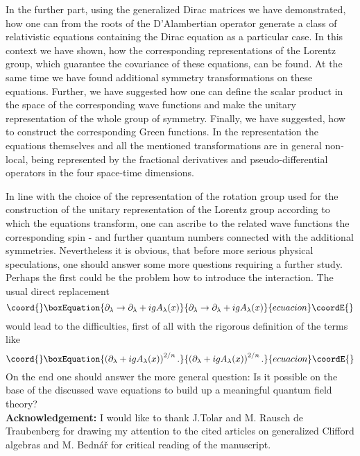 \documentclass[a4paper,a4paper]{article}
\begin{document}
In the further part, using the generalized Dirac matrices we have
demonstrated, how one can from the roots of the D'Alambertian operator
generate a class of relativistic equations containing the Dirac equation as
a particular case. In this context we have shown, how the corresponding
representations of the Lorentz group, which guarantee the covariance of
these equations, can be found. At the same time we have found additional
symmetry transformations on these equations. Further, we have suggested how
one can define the scalar product in the space of the corresponding wave
functions and make the unitary representation of the whole group of
symmetry. Finally, we have suggested, how to construct the corresponding
Green functions. In the \coordHE{} representation the equations themselves and all
the mentioned transformations are in general non-local, being represented by
the fractional derivatives and pseudo-differential operators in the four
space-time dimensions.

In line with the choice of the representation of the rotation group used for
the construction of the unitary representation of the Lorentz group
according to which the equations transform, one can ascribe to the related
wave functions the corresponding spin - and further quantum numbers
connected with the additional symmetries. Nevertheless it is obvious, that
before more serious physical speculations, one should answer some more
questions requiring a further study. Perhaps the first could be the problem
how to introduce the interaction. The usual direct replacement%
\begin{equation*}\coord{}\boxEquation{
\partial _{\lambda }\rightarrow \partial _{\lambda }+igA_{\lambda }(x)
}{
\partial _{\lambda }\rightarrow \partial _{\lambda }+igA_{\lambda }(x)
}{ecuacion}\coordE{}\end{equation*}%
would lead to the difficulties, first of all with the rigorous definition of
the terms like%
\begin{equation*}\coord{}\boxEquation{
\left( \partial _{\lambda }+igA_{\lambda }(x)\right) ^{2/n}.
}{
\left( \partial _{\lambda }+igA_{\lambda }(x)\right) ^{2/n}.
}{ecuacion}\coordE{}\end{equation*}%
On the end one should answer the more general question: Is it possible on
the base of the discussed wave equations to build up a meaningful quantum
field theory? \ \\[5mm]
\noindent \textbf{Acknowledgement:} I would like to thank J.Tolar and M.
Rausch de Traubenberg for drawing my attention to the cited articles on
generalized Clifford algebras and M. Bedn\'{a}\v{r} for critical reading of
the manuscript.
\end{document}

